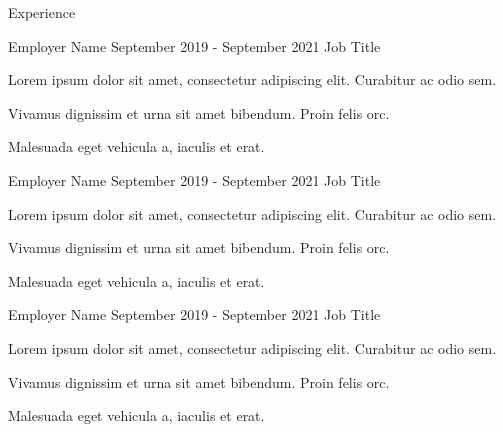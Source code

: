 \documentclass{resume} %
\begin{document}
\begin{rSection}{Experience}

    \begin{rSubsection}
    {Employer Name}
    {September 2019 - September 2021}
    {Job Title}
    {}
    \item Lorem ipsum dolor sit amet, consectetur adipiscing elit. Curabitur ac odio sem.
    \item Vivamus dignissim et urna sit amet bibendum. Proin felis orc.
    \item Malesuada eget vehicula a, iaculis et erat.
    \end{rSubsection}
    
    \begin{rSubsection}
    {Employer Name}
    {September 2019 - September 2021}
    {Job Title}
    {}
    \item Lorem ipsum dolor sit amet, consectetur adipiscing elit. Curabitur ac odio sem.
    \item Vivamus dignissim et urna sit amet bibendum. Proin felis orc.
    \item Malesuada eget vehicula a, iaculis et erat.
    \end{rSubsection}
    
    \begin{rSubsection}
    {Employer Name}
    {September 2019 - September 2021}
    {Job Title}
    {}
    \item Lorem ipsum dolor sit amet, consectetur adipiscing elit. Curabitur ac odio sem.
    \item Vivamus dignissim et urna sit amet bibendum. Proin felis orc.
    \item Malesuada eget vehicula a, iaculis et erat.
    \end{rSubsection}
    
\end{rSection}
\end{document}
